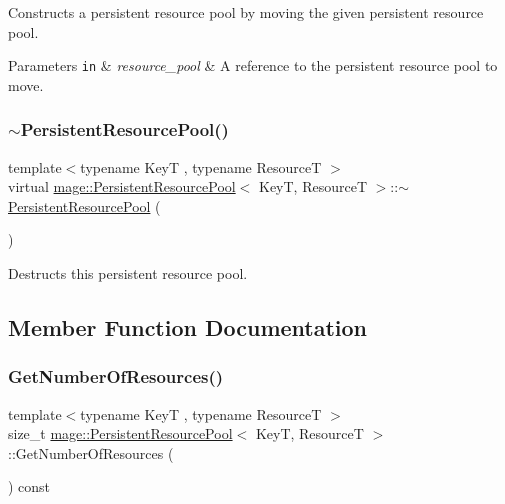Constructs a persistent resource pool by moving the given persistent resource pool.


\begin{DoxyParams}[1]{Parameters}
\mbox{\tt in}  & {\em resource\+\_\+pool} & A reference to the persistent resource pool to move. \\
\hline
\end{DoxyParams}
\hypertarget{classmage_1_1_persistent_resource_pool_a3408c2feb02a1d3b13c16d889fc50709}{}\label{classmage_1_1_persistent_resource_pool_a3408c2feb02a1d3b13c16d889fc50709} 
\subsubsection{\texorpdfstring{$\sim$\+Persistent\+Resource\+Pool()}{~PersistentResourcePool()}}
{\footnotesize\ttfamily template$<$typename KeyT , typename ResourceT $>$ \\
virtual \hyperlink{classmage_1_1_persistent_resource_pool}{mage\+::\+Persistent\+Resource\+Pool}$<$ KeyT, ResourceT $>$\+::$\sim$\hyperlink{classmage_1_1_persistent_resource_pool}{Persistent\+Resource\+Pool} (\begin{DoxyParamCaption}{ }\end{DoxyParamCaption})\hspace{0.3cm}{\ttfamily [virtual]}}

Destructs this persistent resource pool. 

\subsection{Member Function Documentation}
\hypertarget{classmage_1_1_persistent_resource_pool_a16019bc52d2a9eca0d0e239aac4c0566}{}\label{classmage_1_1_persistent_resource_pool_a16019bc52d2a9eca0d0e239aac4c0566} 
\subsubsection{\texorpdfstring{Get\+Number\+Of\+Resources()}{GetNumberOfResources()}}
{\footnotesize\ttfamily template$<$typename KeyT , typename ResourceT $>$ \\
size\+\_\+t \hyperlink{classmage_1_1_persistent_resource_pool}{mage\+::\+Persistent\+Resource\+Pool}$<$ KeyT, ResourceT $>$\+::Get\+Number\+Of\+Resources (\begin{DoxyParamCaption}{ }\end{DoxyParamCaption}) const}

